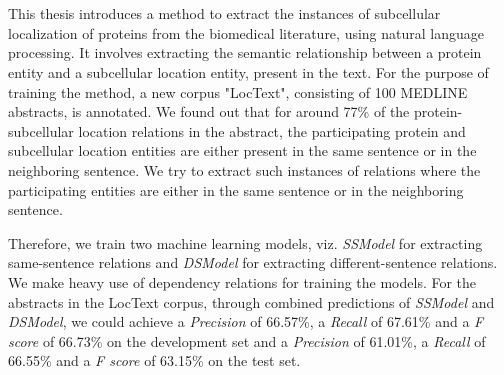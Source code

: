 \chapter{\abstractname}


This thesis introduces a method to extract the instances of subcellular localization of proteins from the biomedical literature, using natural language processing. It involves extracting the semantic relationship between a protein entity and a subcellular location entity, present in the text. For the purpose of training the method, a new corpus "LocText", consisting of 100 MEDLINE abstracts, is annotated. We found out that for around 77\% of the protein-subcellular location relations in the abstract, the participating protein and subcellular location entities are either present in the same sentence or in the neighboring sentence. We try to extract such instances of relations where the participating entities are either in the same sentence or in the neighboring sentence.

Therefore, we train two machine learning models, viz. \textit{SSModel} for extracting same-sentence relations and \textit{DSModel} for extracting different-sentence relations. We make heavy use of dependency relations for training the models. For the abstracts in the LocText corpus, through combined predictions of \textit{SSModel} and \textit{DSModel}, we could achieve a \textit{Precision} of 66.57\%, a \textit{Recall} of 67.61\% and a \textit{F score} of 66.73\% on the development set and a \textit{Precision} of 61.01\%, a \textit{Recall} of 66.55\% and a \textit{F score} of 63.15\% on the test set.
